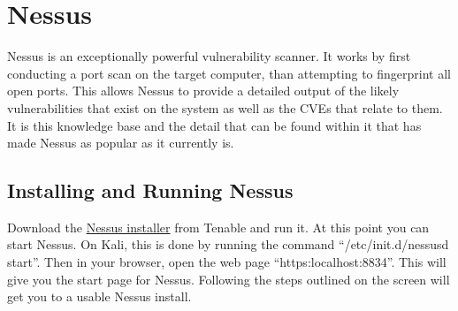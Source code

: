 \documentclass[a4paper,11pt]{report}
\begin{document}
	\section{Nessus}
		Nessus is an exceptionally powerful vulnerability scanner. 
		It works by first conducting a port scan on the target computer, than attempting to fingerprint all open ports. 
		This allows Nessus to provide a detailed output of the likely vulnerabilities that exist on the system as well as the CVEs that relate to them. 
		It is this knowledge base and the detail that can be found within it that has made Nessus as popular as it currently is. 
		
		\subsection{Installing and Running Nessus}
			Download the \href{http://www.tenable.com/products/nessus-vulnerability-scanner}{Nessus installer}
			from Tenable and run it. 
			At this point you can start Nessus. On Kali, this is done by running the command ``/etc/init.d/nessusd start''. 
			Then in your browser, open the web page ``https:localhost:8834''. 
			This will give you the start page for Nessus. 
			Following the steps outlined on the screen will get you to a usable Nessus install. 
\end{document}
